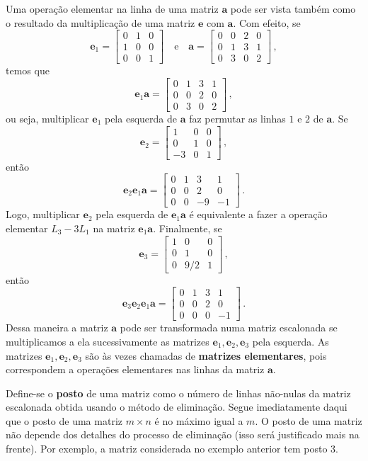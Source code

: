 \documentclass[12pt,a4paper]{report}
\newcommand{\tb}{\textbf}
\newcommand{\mb}{\mathbf}
\begin{document}
Uma operação elementar na linha de uma matriz $\mb a$ pode ser vista também como o resultado da multiplicação de uma matriz $\mb e$ com $\mb a$. Com efeito, se
$$\mb{e}_1=\begin{bmatrix}
  0&1&0\\
  1&0&0\\
  0&0&1
\end{bmatrix}\quad\text{e}\quad \mb a=\begin{bmatrix}
  0&0&2&0\\
  0&1&3&1\\
  0&3&0&2
\end{bmatrix}\,,$$
temos que
$$\mb{e}_1\mb a=\begin{bmatrix}
  0&1&3&1\\
  0&0&2&0\\
  0&3&0&2
\end{bmatrix}\,,$$
ou seja, multiplicar $\mb e_1$ pela esquerda de $\mb a$ faz permutar as linhas $1$ e $2$ de $\mb a$. Se
$$\mb e_2=\begin{bmatrix}
  1&0&0\\
  0&1&0\\
  -3&0&1
\end{bmatrix}\,,$$
então
$$\mb e_2\mb e_1\mb a=\begin{bmatrix}
  0&1&3&1\\
  0&0&2&0\\
  0&0&-9&-1
\end{bmatrix}\,.$$
Logo, multiplicar $\mb e_2$ pela esquerda de $\mb e_1\mb a$ é equivalente a fazer a operação elementar $L_3-3L_1$ na matriz $\mb e_1\mb a$. Finalmente, se
$$\mb e_3=\begin{bmatrix}
  1&0&0\\
  0&1&0\\
  0&9/2&1
\end{bmatrix}\,,$$
então
$$\mb e_3\mb e_2\mb e_1\mb a=\begin{bmatrix}
  0&1&3&1\\
  0&0&2&0\\
  0&0&0&-1
\end{bmatrix}\,.$$
Dessa maneira a matriz $\mb a$ pode ser transformada numa matriz escalonada se multiplicamos a ela sucessivamente as matrizes $\mb e_1,\mb e_2,\mb e_3$ pela esquerda. As matrizes $\mb e_1,\mb e_2,\mb e_3$ são às vezes chamadas de \tb{matrizes elementares}, pois correspondem a operações elementares nas linhas da matriz $\mb a$.


Define-se o \tb{posto} de uma matriz como o número de linhas não-nulas da matriz escalonada obtida usando o método de eliminação. Segue imediatamente daqui que o posto de uma matriz $m\times n$ é no máximo igual a $m$. O posto de uma matriz não depende dos detalhes do processo de eliminação (isso será justificado mais na frente). Por exemplo, a matriz considerada no exemplo anterior tem posto $3$.
\end{document}
